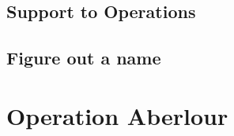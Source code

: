 \documentclass[noraggedright]{turabian-researchpaper}
\begin{document}
	\subsection{Support to Operations}
		



		

	\subsection{Figure out a name} %

\section{Operation Aberlour}
\end{document}
